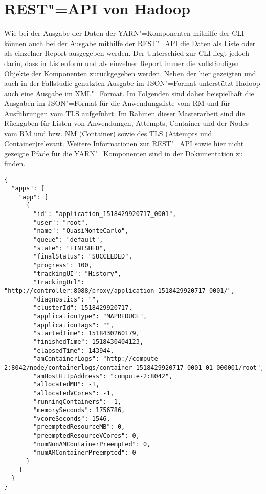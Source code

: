 \chapter{REST"=API von Hadoop}
\label{app:hadoopRestApi}

Wie bei der Ausgabe der Daten der YARN"=Komponenten mithilfe der \gls{CLI} können auch bei der Ausgabe mithilfe der REST"=API die Daten als Liste oder als einzelner Report ausgegeben werden.
Der Unterschied zur \gls{CLI} liegt jedoch darin, dass in Listenform und als einzelner Report immer die vollständigen Objekte der Komponenten zurückgegeben werden.
Neben der hier gezeigten und auch in der Fallstudie genutzten Ausgabe im JSON"=Format unterstützt Hadoop auch eine Ausgabe im XML"=Format.
Im Folgenden sind daher beispielhaft die Ausgaben im JSON"=Format für die Anwendungsliste vom \gls{RM} und für Ausführungen vom \gls{TLS} aufgeführt.
Im Rahmen dieser Masterarbeit sind die Rückgaben für Listen von Anwendungen, Attempts, Container und der Nodes vom \gls{RM} und bzw. \gls{NM} (Container) sowie des \gls{TLS} (Attempts und Container)relevant.
Weitere Informationen zur REST"=API sowie hier nicht gezeigte Pfade für die YARN"=Komponenten sind in der Dokumentation \cite{HadoopYarnTlServer271,HadoopRmApi271,HadoopNmApi271} zu finden.

\begin{lstlisting}[label=lst:hadoopAppListRestRm,style=json,
caption={[REST"=Ausgabe aller Anwendungen vom \glsentryshort{RM}]
    REST"=Ausgabe aller Anwendungen vom \acrshort{RM}.
    Die Liste kann mithilfe verschiedener Query"=Parameter gefiltert werden.\\
    URL: \url{http://addr:port/ws/v1/cluster/apps}}]
{
  "apps": {
    "app": [
      {
        "id": "application_1518429920717_0001",
        "user": "root",
        "name": "QuasiMonteCarlo",
        "queue": "default",
        "state": "FINISHED",
        "finalStatus": "SUCCEEDED",
        "progress": 100,
        "trackingUI": "History",
        "trackingUrl": "http://controller:8088/proxy/application_1518429920717_0001/",
        "diagnostics": "",
        "clusterId": 1518429920717,
        "applicationType": "MAPREDUCE",
        "applicationTags": "",
        "startedTime": 1518430260179,
        "finishedTime": 1518430404123,
        "elapsedTime": 143944,
        "amContainerLogs": "http://compute-2:8042/node/containerlogs/container_1518429920717_0001_01_000001/root",
        "amHostHttpAddress": "compute-2:8042",
        "allocatedMB": -1,
        "allocatedVCores": -1,
        "runningContainers": -1,
        "memorySeconds": 1756786,
        "vcoreSeconds": 1546,
        "preemptedResourceMB": 0,
        "preemptedResourceVCores": 0,
        "numNonAMContainerPreempted": 0,
        "numAMContainerPreempted": 0
      }
    ]
  }
}
\end{lstlisting}

